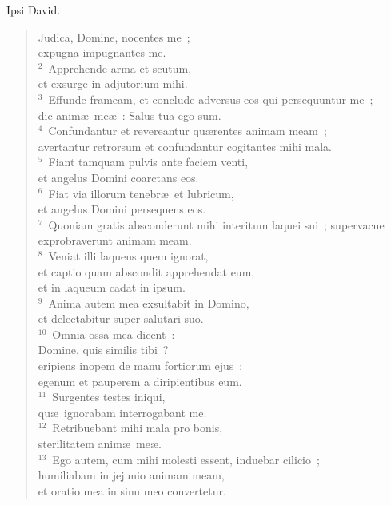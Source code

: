 \bchapter
\lettrine[lines=3,image=true,loversize=0.05,lraise=-0.03]{I}{}psi David. \begin{flushleft}\begin{verse}\vspace{6pt}Judica, Domine, nocentes me~;\\ expugna impugnantes me.\\
${}^{2}$~Apprehende arma et scutum,\\ et exsurge in adjutorium mihi.\\
${}^{3}$~Effunde frameam, et conclude adversus eos qui persequuntur me~;\\ dic anim\ae\ me\ae~: Salus tua ego sum.\\
${}^{4}$~Confundantur et revereantur qu\ae rentes animam meam~;\\ avertantur retrorsum et confundantur cogitantes mihi mala.\\
${}^{5}$~Fiant tamquam pulvis ante faciem venti,\\ et angelus Domini coarctans eos.\\
${}^{6}$~Fiat via illorum tenebr\ae\ et lubricum,\\ et angelus Domini persequens eos.\\
${}^{7}$~Quoniam gratis absconderunt mihi interitum laquei sui~; supervacue exprobraverunt animam meam.\\
${}^{8}$~Veniat illi laqueus quem ignorat,\\ et captio quam abscondit apprehendat eum,\\ et in laqueum cadat in ipsum.\\
${}^{9}$~Anima autem mea exsultabit in Domino,\\ et delectabitur super salutari suo.\\
${}^{10}$~Omnia ossa mea dicent~:\\ Domine, quis similis tibi~?\\ eripiens inopem de manu fortiorum ejus~;\\ egenum et pauperem a diripientibus eum.\\
${}^{11}$~Surgentes testes iniqui,\\ qu\ae\ ignorabam interrogabant me.\\
${}^{12}$~Retribuebant mihi mala pro bonis,\\ sterilitatem anim\ae\ me\ae .\\
${}^{13}$~Ego autem, cum mihi molesti essent, induebar cilicio~;\\ humiliabam in jejunio animam meam,\\ et oratio mea in sinu meo convertetur.\\

\end{verse}
\end{flushleft}
